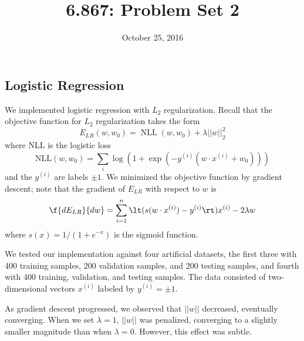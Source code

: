 \documentclass{article}
\title{6.867: Problem Set 2}
\date{October 25, 2016}
\DeclareMathOperator{\NLL}{NLL}
\newcommand{\sind}[1]{^{(#1)}}
\begin{document}
\maketitle

\begin{multicols}{2}


\section{Logistic Regression}
\label{sec:lr}

We implemented logistic regression with $L_2$ regularization.
Recall that the objective function for $L_2$ regularization takes the form
\begin{equation}
    E_{LR}(w, w_0) = \NLL(w, w_0) + \lambda ||w||_2^2
\end{equation}
where NLL is the logistic loss
\begin{equation}
    \text{NLL}(w, w_0) = \sum_i{\log(1+\exp(-y^{(i)}(w\cdot x^{(i)}+w_0)))}
\end{equation}
and the $y\sind{i}$ are labels $\pm 1$.
We minimized the objective function by gradient descent;
note that the gradient of $E_{LR}$ with respect to $w$ is
\begin{equation}
    \f{d E_{LR}}{dw} = \sum_{i=1}^n\lt(s(w\cdot x^{(i)})-y^{(i)}\rt)x^{(i)} - 2\lambda w
\end{equation}
where $s(x) = 1/(1+e^{-x})$ is the sigmoid function.

We tested our implementation against four artificial datasets,
the first three with 400 training samples,
200 validation samples,
and 200 testing samples, and fourth with 400 training, validation, and testing samples.
The data consisted of two-dimensional vectors $x\sind{i}$ labeled by $y\sind{i} = \pm1$.

As gradient descent progressed,
we observed that $||w||$ decreased, eventually converging. When we set $\lambda = 1$, 
$||w||$ was penalized, converging to a slightly smaller magnitude than when $\lambda = 0$.
However, this effect was subtle.



\end{multicols}
\end{document}
